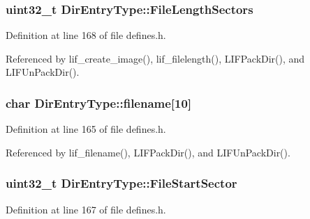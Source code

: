 \subsubsection[{\texorpdfstring{File\+Length\+Sectors}{FileLengthSectors}}]{\setlength{\rightskip}{0pt plus 5cm}uint32\+\_\+t Dir\+Entry\+Type\+::\+File\+Length\+Sectors}\hypertarget{structDirEntryType_a0ad3a6b6da198caa68e7e82d025975cb}{}\label{structDirEntryType_a0ad3a6b6da198caa68e7e82d025975cb}


Definition at line 168 of file defines.\+h.



Referenced by lif\+\_\+create\+\_\+image(), lif\+\_\+filelength(), L\+I\+F\+Pack\+Dir(), and L\+I\+F\+Un\+Pack\+Dir().

\subsubsection[{\texorpdfstring{filename}{filename}}]{\setlength{\rightskip}{0pt plus 5cm}char Dir\+Entry\+Type\+::filename\mbox{[}10\mbox{]}}\hypertarget{structDirEntryType_aa60fae0a6b7ba9c966cbcf46e555f396}{}\label{structDirEntryType_aa60fae0a6b7ba9c966cbcf46e555f396}


Definition at line 165 of file defines.\+h.



Referenced by lif\+\_\+filename(), L\+I\+F\+Pack\+Dir(), and L\+I\+F\+Un\+Pack\+Dir().

\subsubsection[{\texorpdfstring{File\+Start\+Sector}{FileStartSector}}]{\setlength{\rightskip}{0pt plus 5cm}uint32\+\_\+t Dir\+Entry\+Type\+::\+File\+Start\+Sector}\hypertarget{structDirEntryType_a062849a9cc935042c7a3a28ed90ab6a1}{}\label{structDirEntryType_a062849a9cc935042c7a3a28ed90ab6a1}


Definition at line 167 of file defines.\+h.



